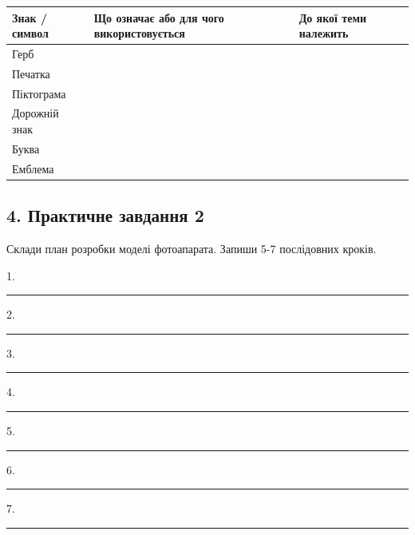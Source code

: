 \documentclass[11pt,a4paper]{article}
\begin{document}
\begin{tabularx}{\linewidth}{|>{\raggedright\arraybackslash}X|>{\raggedright\arraybackslash}X|>{\raggedright\arraybackslash}X|}\hline

\textbf{Знак / символ} & \textbf{Що означає або для чого використовується} & \textbf{До якої теми належить} \\ \hline

Герб &  &  \\ \hline

Печатка &  &  \\ \hline

Піктограма &  &  \\ \hline

Дорожній знак &  &  \\ \hline

Буква &  &  \\ \hline

Емблема &  &  \\ \hline

\end{tabularx}\par

\subsection*{4. Практичне завдання 2}

Склади план розробки моделі фотоапарата. Запиши 5-7 послідовних кроків.\par

1. \rule{0.65\linewidth}{0.4pt}\par

2. \rule{0.65\linewidth}{0.4pt}\par

3. \rule{0.65\linewidth}{0.4pt}\par

4. \rule{0.65\linewidth}{0.4pt}\par

5. \rule{0.65\linewidth}{0.4pt}\par

6. \rule{0.65\linewidth}{0.4pt}\par

7. \rule{0.65\linewidth}{0.4pt}\par
\end{document}
